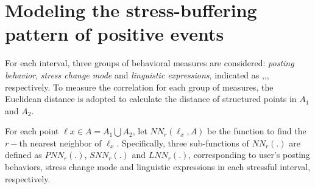 \section{Modeling the stress-buffering pattern of positive events}
\label{mod:mod1}
For each interval, three groups of behavioral measures are considered: \emph{posting behavior},
\emph{stress change mode} and \emph{linguistic expressions},
indicated as ,,, respectively. 
To measure the correlation for each group of measures,
the Euclidean distance is adopted to calculate the distance of structured points in $A_1$ and $A_2$. 

For each point $\ell x \in A=A_1\bigcup A_2$, 
let $NN_r(\ell_x,A)$ be the function to find the $r-$th nearest neighbor of $\ell_x$.
Specifically, three sub-functions of $NN_r(.)$ are defined as $PNN_r(.)$, $SNN_r(.)$ and $LNN_r(.)$,
corresponding to user's posting behaviors, stress change mode and linguistic expressions in each stressful interval, respectively.

